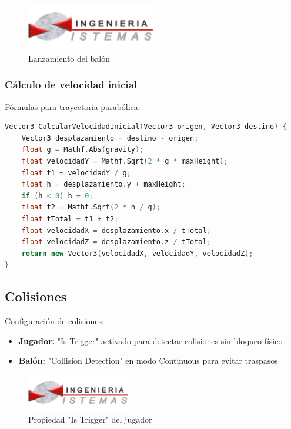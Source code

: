 \begin{figure}[h]
    \centering
    \includegraphics[width=0.5\textwidth]{img/epis.png}
    \caption{Lanzamiento del balón}
    \label{fig:lanzamiento}
\end{figure}

\subsubsection{Cálculo de velocidad inicial}
Fórmulas para trayectoria parabólica:
\begin{lstlisting}[language=C++]
Vector3 CalcularVelocidadInicial(Vector3 origen, Vector3 destino) {
    Vector3 desplazamiento = destino - origen;
    float g = Mathf.Abs(gravity);
    float velocidadY = Mathf.Sqrt(2 * g * maxHeight);
    float t1 = velocidadY / g;
    float h = desplazamiento.y + maxHeight;
    if (h < 0) h = 0;
    float t2 = Mathf.Sqrt(2 * h / g);
    float tTotal = t1 + t2;
    float velocidadX = desplazamiento.x / tTotal;
    float velocidadZ = desplazamiento.z / tTotal;
    return new Vector3(velocidadX, velocidadY, velocidadZ);
}
\end{lstlisting}

\subsection{Colisiones}
Configuración de colisiones:
\begin{itemize}
    \item \textbf{Jugador:} "Is Trigger" activado para detectar colisiones sin bloqueo físico
    \item \textbf{Balón:} "Collision Detection" en modo Continuous para evitar traspasos
\end{itemize}

\begin{figure}[h]
    \centering
    \includegraphics[width=0.4\textwidth]{img/epis.png}
    \caption{Propiedad "Is Trigger" del jugador}
    \label{fig:trigger}
\end{figure}

